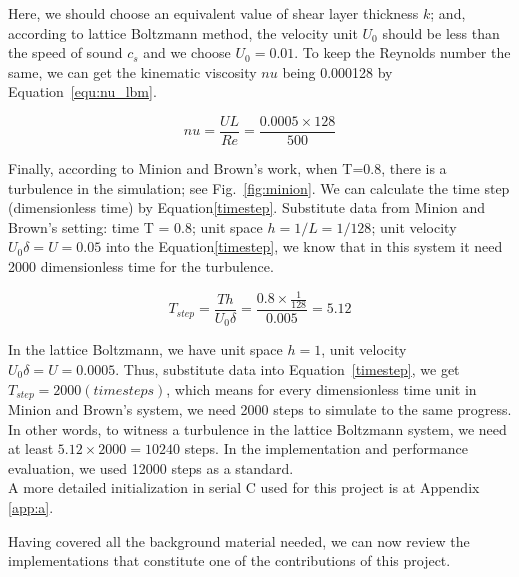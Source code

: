 Here, we should choose an equivalent value of shear layer thickness $k$; and, according to lattice Boltzmann method, the velocity unit $U_0$ should be less than the speed of sound $c_s$ and we choose $U_0 = 0.01$. To keep the Reynolds number the same, we can get the kinematic viscosity $nu$ being 0.000128 by Equation~\ref{equ:nu_lbm}.

\begin{equation}
    \label{equ:nu_lbm}
    nu = \frac{UL}{Re} = \frac{0.0005 \times 128}{500}  
\end{equation}

Finally, according to Minion and Brown's work, when T=0.8, there is a turbulence in the simulation; see Fig.~\ref{fig:minion}. We can calculate the time step (dimensionless time) by Equation\ref{timestep}. Substitute data from Minion and Brown's setting: time T = 0.8;  unit space $h=1/L=1/128$; unit velocity $U_0 \delta=U=0.05$  into the Equation\ref{timestep}, we know that in this system it need 2000 dimensionless time for the turbulence.

\begin{equation}
\label{timestep}
    T_{step} = \frac{T h}{U_0 \delta} = \frac{0.8 \times \frac{1}{128}}{0.005 } = 5.12
\end{equation}

In the lattice Boltzmann, we have unit space $h=1$, unit velocity $U_0 \delta = U = 0.0005$. Thus, substitute data into Equation~\ref{timestep}, we get $T_{step} = 2000 (timesteps)$, which means for every dimensionless time unit in Minion and Brown's system, we need 2000 steps to simulate to the same progress. In other words, to witness a turbulence in the lattice Boltzmann system, we need at least $5.12 \times 2000 = 10240$ steps. In the implementation and performance evaluation, we used 12000 steps as a standard.\\

A more detailed initialization in serial C used for this project is at Appendix \ref{app:a}.


\vspace*{+3.2cm}
Having covered all the background material needed, we can now review the implementations that constitute one of the contributions of this project.

